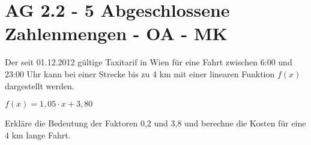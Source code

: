 \section{AG 2.2 - 5 Abgeschlossene Zahlenmengen - OA - MK}

\begin{beispiel}[AG 2.2]{1} %
				Der seit 01.12.2012 gültige Taxitarif in Wien für eine Fahrt zwischen 6:00 und 23:00 Uhr kann bei einer Strecke bis zu 4 km mit einer linearen Funktion $f(x)$ dargestellt werden.
\begin{center}
$f(x)=1,05\cdot x+3,80$
\end{center}

Erkläre die Bedeutung der Faktoren 0,2 und 3,8 und berechne die Kosten für eine 4 km lange Fahrt.\\

\end{beispiel}